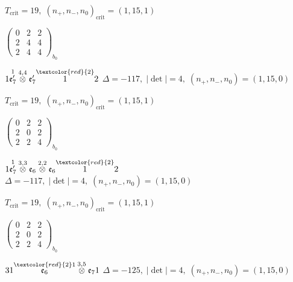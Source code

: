 \documentclass[10pt]{article}
\begin{document}
\hspace{1em}$T_{\text{crit}}=19,\; (n_+,n_-,n_0)_{\text{crit}}=(1,15,1)$

\hspace{2em}$\left(\begin{smallmatrix}0 & 2 & 2 \\ 2 & 4 & 4 \\ 2 & 4 & 4\end{smallmatrix}\right)_{\!b_0}$

\smallskip

$1\overset{1}{\mathfrak{e}_7'}\overset{4,4}{\otimes}\mathfrak{e}_7'\overset{\textcolor{red}{2}}{1}2$ \quad $\Delta=-117,\; |\det|=4,\; (n_+,n_-,n_0)=(1,15,0)$

\hspace{1em}$T_{\text{crit}}=19,\; (n_+,n_-,n_0)_{\text{crit}}=(1,15,1)$

\hspace{2em}$\left(\begin{smallmatrix}0 & 2 & 2 \\ 2 & 0 & 2 \\ 2 & 2 & 4\end{smallmatrix}\right)_{\!b_0}$

\smallskip

$1\overset{1}{\mathfrak{e}_7'}\overset{3,3}{\otimes}\mathfrak{e}_6\overset{2,2}{\otimes}\mathfrak{e}_6\overset{\textcolor{red}{2}}{1}2$ \quad $\Delta=-117,\; |\det|=4,\; (n_+,n_-,n_0)=(1,15,0)$

\hspace{1em}$T_{\text{crit}}=19,\; (n_+,n_-,n_0)_{\text{crit}}=(1,15,1)$

\hspace{2em}$\left(\begin{smallmatrix}0 & 2 & 2 \\ 2 & 0 & 2 \\ 2 & 2 & 4\end{smallmatrix}\right)_{\!b_0}$

\smallskip

$31\overset{\textcolor{red}{2}1}{\mathfrak{e}_6}\overset{3,5}{\otimes}\mathfrak{e}_71$ \quad $\Delta=-125,\; |\det|=4,\; (n_+,n_-,n_0)=(1,15,0)$
\end{document}

